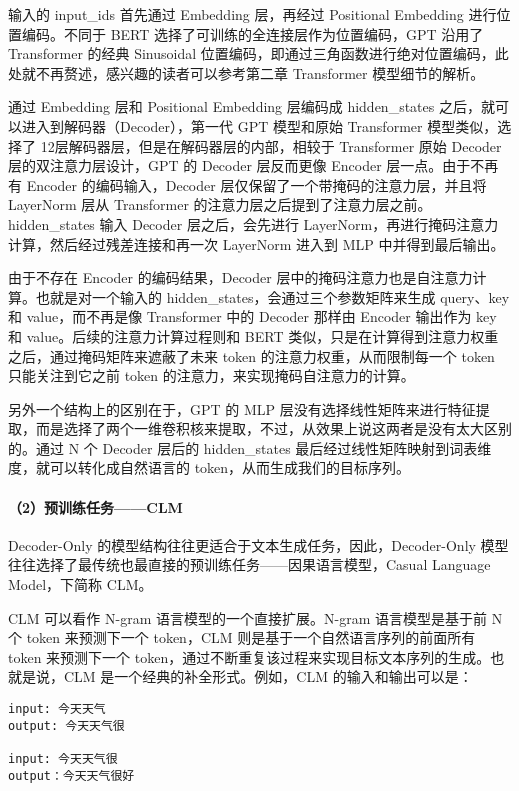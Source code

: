 \documentclass[
]{article}
\begin{document}
输入的 input\_ids 首先通过 Embedding 层，再经过 Positional Embedding
进行位置编码。不同于 BERT 选择了可训练的全连接层作为位置编码，GPT 沿用了
Transformer 的经典 Sinusoidal
位置编码，即通过三角函数进行绝对位置编码，此处就不再赘述，感兴趣的读者可以参考第二章
Transformer 模型细节的解析。

通过 Embedding 层和 Positional Embedding 层编码成 hidden\_states
之后，就可以进入到解码器（Decoder），第一代 GPT 模型和原始 Transformer
模型类似，选择了 12层解码器层，但是在解码器层的内部，相较于 Transformer
原始 Decoder 层的双注意力层设计，GPT 的 Decoder 层反而更像 Encoder
层一点。由于不再有 Encoder 的编码输入，Decoder
层仅保留了一个带掩码的注意力层，并且将 LayerNorm 层从 Transformer
的注意力层之后提到了注意力层之前。hidden\_states 输入 Decoder
层之后，会先进行
LayerNorm，再进行掩码注意力计算，然后经过残差连接和再一次 LayerNorm
进入到 MLP 中并得到最后输出。

由于不存在 Encoder 的编码结果，Decoder
层中的掩码注意力也是自注意力计算。也就是对一个输入的
hidden\_states，会通过三个参数矩阵来生成 query、key 和 value，而不再是像
Transformer 中的 Decoder 那样由 Encoder 输出作为 key 和
value。后续的注意力计算过程则和 BERT
类似，只是在计算得到注意力权重之后，通过掩码矩阵来遮蔽了未来 token
的注意力权重，从而限制每一个 token 只能关注到它之前 token
的注意力，来实现掩码自注意力的计算。

另外一个结构上的区别在于，GPT 的 MLP
层没有选择线性矩阵来进行特征提取，而是选择了两个一维卷积核来提取，不过，从效果上说这两者是没有太大区别的。通过
N 个 Decoder 层后的 hidden\_states
最后经过线性矩阵映射到词表维度，就可以转化成自然语言的
token，从而生成我们的目标序列。

\paragraph{（2）预训练任务------CLM}\label{ux9884ux8badux7ec3ux4efbux52a1clm}

Decoder-Only 的模型结构往往更适合于文本生成任务，因此，Decoder-Only
模型往往选择了最传统也最直接的预训练任务------因果语言模型，Casual
Language Model，下简称 CLM。

CLM 可以看作 N-gram 语言模型的一个直接扩展。N-gram 语言模型是基于前 N 个
token 来预测下一个 token，CLM 则是基于一个自然语言序列的前面所有 token
来预测下一个
token，通过不断重复该过程来实现目标文本序列的生成。也就是说，CLM
是一个经典的补全形式。例如，CLM 的输入和输出可以是：

\begin{verbatim}
input: 今天天气
output: 今天天气很

input: 今天天气很
output：今天天气很好
\end{verbatim}
\end{document}

